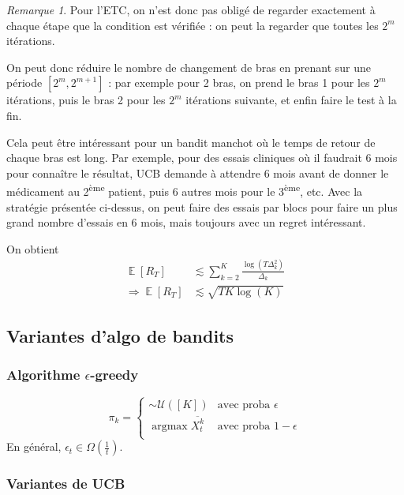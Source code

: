 \documentclass{article}
\DeclareMathOperator*{\argmax}{argmax}
\DeclareMathOperator*{\E}{\mathbb{E}}
\theoremstyle{remark}
\theoremstyle{remark}
\newtheorem{remark}{Remarque}[section]
\begin{document}
\begin{remark}
   Pour l'ETC, on n'est donc pas obligé de regarder exactement à chaque étape que la condition est vérifiée : on peut la regarder que toutes les $2^m$ itérations.

   On peut donc réduire le nombre de changement de bras en prenant sur une période $[2^m, 2^{m+1}]$ : par exemple pour 2 bras, on prend le bras 1 pour les $2^m$ itérations, puis le bras 2 pour les $2^m$ itérations suivante, et enfin faire le test à la fin.

   Cela peut être intéressant pour un bandit manchot où le temps de retour de chaque bras est long. Par exemple, pour des essais cliniques où il faudrait 6 mois pour connaître le résultat, UCB demande à attendre 6 mois avant de donner le médicament au 2\textsuperscript{ème} patient, puis 6 autres mois pour le 3\textsuperscript{ème}, etc. Avec la stratégie présentée ci-dessus, on peut faire des essais par blocs pour faire un plus grand nombre d'essais en 6 mois, mais toujours avec un regret intéressant.

   On obtient
   \begin{align*}
      \E[R_T] &\lesssim \sum_{k=2}^K \frac{\log(T \Delta_k^2)}{\Delta_k} \\
      \Rightarrow \E[R_T] &\lesssim \sqrt{T K \log(K)}
   \end{align*}

\end{remark}

\subsection{Variantes d'algo de bandits}

\subsubsection{Algorithme $\epsilon$-greedy}
$$
\pi_k = \left\{\begin{array}{ll}
   \sim \mathcal{U}([K]) & \text{avec proba $\epsilon$} \\
   \argmax \overline{X_t^k} & \text{avec proba $1-\epsilon$} \\
\end{array}\right.
$$
En général, $\epsilon_t \in \Omega(\frac{1}{t})$.

\subsubsection{Variantes de UCB}
\end{document}

